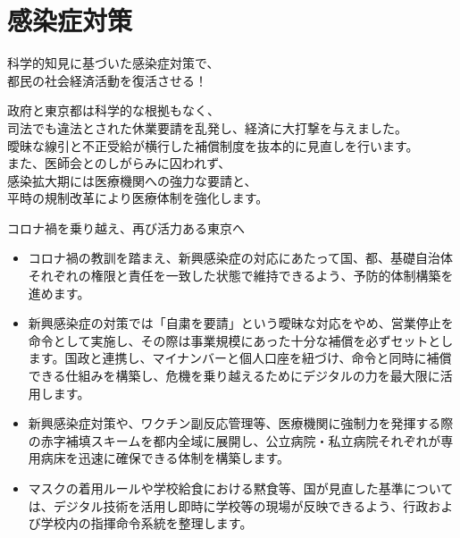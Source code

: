 \documentclass[dvipdfmx]{beamer}
\begin{document}
\section{感染症対策}
    \begin{frame}
        \sectionpage
        \begin{center}
            \begin{large}
                \alert{科学的知見に基づいた感染症対策で、}\\\alert{都民の社会経済活動を復活させる！}
            \end{large}
        \end{center}
        \begin{small}
            政府と東京都は科学的な根拠もなく、\\
            司法でも違法とされた休業要請を乱発し、経済に大打撃を与えました。\\
            曖昧な線引と不正受給が横行した補償制度を抜本的に見直しを行います。\\
            また、医師会とのしがらみに囚われず、\\
            感染拡大期には医療機関への強力な要請と、\\
            平時の規制改革により医療体制を強化します。
        \end{small}
    \end{frame}

    \begin{frame}{コロナ禍を乗り越え、再び活力ある東京へ}{}
        \begin{small}
            \begin{itemize}
                \setlength{\itemsep}{2mm}
                \item コロナ禍の教訓を踏まえ、新興感染症の対応にあたって国、都、基礎自治体それぞれの権限と責任を一致した状態で維持できるよう、予防的体制構築を進めます。
                \item 新興感染症の対策では「自粛を要請」という曖昧な対応をやめ、営業停止を命令として実施し、その際は事業規模にあった十分な補償を必ずセットとします。国政と連携し、マイナンバーと個人口座を紐づけ、命令と同時に補償できる仕組みを構築し、危機を乗り越えるためにデジタルの力を最大限に活用します。
                \item 新興感染症対策や、ワクチン副反応管理等、医療機関に強制力を発揮する際の赤字補填スキームを都内全域に展開し、公立病院・私立病院それぞれが専用病床を迅速に確保できる体制を構築します。
                \item マスクの着用ルールや学校給食における黙食等、国が見直した基準については、デジタル技術を活用し即時に学校等の現場が反映できるよう、行政および学校内の指揮命令系統を整理します。
            \end{itemize}
        \end{small}
    \end{frame}
\end{document}
